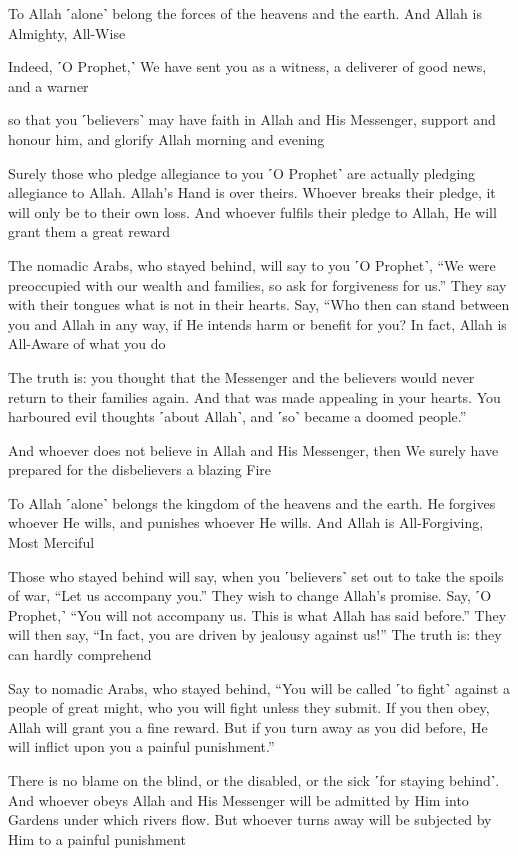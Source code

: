 To Allah ˹alone˺ belong the forces of the heavens and the earth. And Allah is Almighty, All-Wise

Indeed, ˹O Prophet,˺ We have sent you as a witness, a deliverer of good news, and a warner

so that you ˹believers˺ may have faith in Allah and His Messenger, support and honour him, and glorify Allah morning and evening

Surely those who pledge allegiance to you ˹O Prophet˺ are actually pledging allegiance to Allah. Allah’s Hand is over theirs. Whoever breaks their pledge, it will only be to their own loss. And whoever fulfils their pledge to Allah, He will grant them a great reward

The nomadic Arabs, who stayed behind, will say to you ˹O Prophet˺, “We were preoccupied with our wealth and families, so ask for forgiveness for us.” They say with their tongues what is not in their hearts. Say, “Who then can stand between you and Allah in any way, if He intends harm or benefit for you? In fact, Allah is All-Aware of what you do

The truth is: you thought that the Messenger and the believers would never return to their families again. And that was made appealing in your hearts. You harboured evil thoughts ˹about Allah˺, and ˹so˺ became a doomed people.”

And whoever does not believe in Allah and His Messenger, then We surely have prepared for the disbelievers a blazing Fire

To Allah ˹alone˺ belongs the kingdom of the heavens and the earth. He forgives whoever He wills, and punishes whoever He wills. And Allah is All-Forgiving, Most Merciful

Those who stayed behind will say, when you ˹believers˺ set out to take the spoils of war, “Let us accompany you.” They wish to change Allah’s promise. Say, ˹O Prophet,˺ “You will not accompany us. This is what Allah has said before.” They will then say, “In fact, you are driven by jealousy against us!” The truth is: they can hardly comprehend

Say to nomadic Arabs, who stayed behind, “You will be called ˹to fight˺ against a people of great might, who you will fight unless they submit. If you then obey, Allah will grant you a fine reward. But if you turn away as you did before, He will inflict upon you a painful punishment.”

There is no blame on the blind, or the disabled, or the sick ˹for staying behind˺. And whoever obeys Allah and His Messenger will be admitted by Him into Gardens under which rivers flow. But whoever turns away will be subjected by Him to a painful punishment

